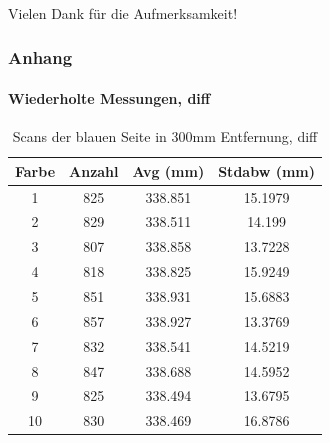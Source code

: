 \documentclass[xcolor=dvipsnames]{beamer}
\def\framesubtitles#1{\framesubtitle{\hspace{3.5ex}#1}}
\begin{document}
\begin{frame}
\begin{columns}
	\end{columns}

\end{frame}


\begin{frame}
	\frametitle{\mbox{}}
	\framesubtitles{}
	\center \LARGE Vielen Dank für die Aufmerksamkeit!
\end{frame}


\begin{frame}[noframenumbering]
	\frametitle{Anhang}
	\framesubtitle{Wiederholte Messungen, diff}
	\begin{table}
		\begin{tabular}{c|c|c|c}
			Farbe & Anzahl & Avg (mm) & Stdabw (mm) \\
			\hline
			1 & 825 & 338.851 & 15.1979 \\
			2 & 829 & 338.511 & 14.199 \\
			3 & 807 & 338.858 & 13.7228 \\
			4 & 818 & 338.825 & 15.9249 \\
			5 & 851 & 338.931 & 15.6883 \\
			6 & 857 & 338.927 & 13.3769 \\
			7 & 832 & 338.541 & 14.5219 \\
			8 & 847 & 338.688 & 14.5952 \\
			9 & 825 & 338.494 & 13.6795 \\
			10 & 830 & 338.469 & 16.8786 \\
		\end{tabular}
		\caption{Scans der blauen Seite in 300mm Entfernung, diff}
	\end{table}
\end{frame}
\end{document}
